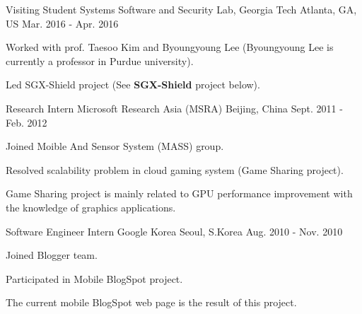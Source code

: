 

\begin{cventries}

  \cventry
    {Visiting Student} %
    {Systems Software and Security Lab, Georgia Tech} %
    {Atlanta, GA, US} %
    {Mar. 2016 - Apr. 2016} %
    {
      \begin{cvitems} %
      \item {Worked with prof. Taesoo Kim and Byoungyoung Lee
          (Byoungyoung Lee is currently a professor in Purdue university).}
      \item {Led SGX-Shield project (See \textbf{SGX-Shield} project below).}
      \end{cvitems}
    }

  \cventry
    {Research Intern} %
    {Microsoft Research Asia (MSRA)} %
    {Beijing, China} %
    {Sept. 2011 - Feb. 2012} %
    {
      \begin{cvitems} %
      \item {Joined Moible And Sensor System (MASS) group.}
      \item {Resolved scalability problem in cloud gaming system (Game Sharing project).}
      \item {Game Sharing project is mainly related to GPU performance improvement with
          the knowledge of graphics applications.}
      \end{cvitems}
    }

  \cventry
    {Software Engineer Intern} %
    {Google Korea} %
    {Seoul, S.Korea} %
    {Aug. 2010 - Nov. 2010} %
    {
      \begin{cvitems} %
      \item {Joined Blogger team.}
      \item {Participated in Mobile BlogSpot project.}
      \item {The current mobile BlogSpot web page is the result of this project.}
      \end{cvitems}
    }

\end{cventries}
